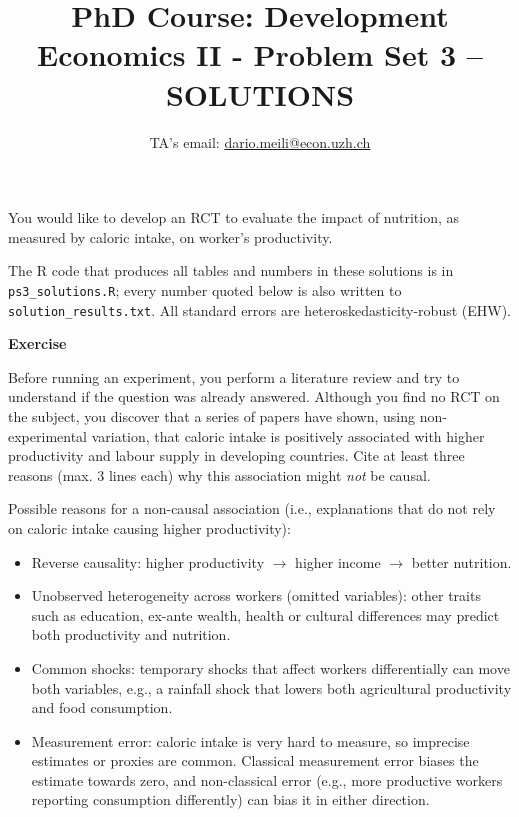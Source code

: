 \documentclass[10pt]{article}
\title{PhD Course: Development Economics II - Problem Set 3 -- SOLUTIONS} %
\author{%
	\normalsize TA's email: \href{mailto:dario.meili@econ.uzh.ch}{dario.meili@econ.uzh.ch}
}
\date{} %
\newcounter{exercise}
\newenvironment{exercise}%
{%
	\refstepcounter{exercise}%
	\textbf{Exercise \theexercise}%
	}%
{
 \par\vspace{\baselineskip}%
\noindent\ignorespacesafterend
}
\begin{document}
\maketitle

You would like to develop an RCT to evaluate the impact of nutrition, as measured by caloric intake, on worker's productivity.

\color{red}
The R code that produces all tables and numbers in these solutions is in \texttt{ps3\_solutions.R}; every number quoted below is also written to \texttt{solution\_results.txt}. All standard errors are heteroskedasticity-robust (EHW).
\color{black}

\begin{exercise}
	Before running an experiment, you perform a literature review and try to understand if the question was already answered. Although you find no RCT on the subject, you discover that a series of papers have shown, using non-experimental variation, that caloric intake is positively associated with higher productivity and labour supply in developing countries. Cite at least three reasons (max. 3 lines each) why this association might \textit{not} be causal.
\end{exercise}

\color{red}
Possible reasons for a non-causal association (i.e., explanations that do not rely on caloric intake causing higher productivity):
\begin{itemize}
	\item Reverse causality: higher productivity $\rightarrow$ higher income $\rightarrow$ better nutrition.
	\item Unobserved heterogeneity across workers (omitted variables): other traits such as education, ex-ante wealth, health or cultural differences may predict both productivity and nutrition.
	\item Common shocks: temporary shocks that affect workers differentially can move both variables, e.g., a rainfall shock that lowers both agricultural productivity and food consumption.
	\item Measurement error: caloric intake is very hard to measure, so imprecise estimates or proxies are common. Classical measurement error biases the estimate towards zero, and non-classical error (e.g., more productive workers reporting consumption differently) can bias it in either direction.
\end{itemize}
\color{black}

\end{document}
